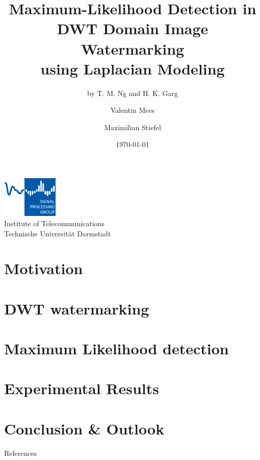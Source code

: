 \documentclass[accentcolor=tud1b,colorbacktitle]{tudbeamer}
\title{Maximum-Likelihood Detection in\\ DWT Domain Image Watermarking\\ using Laplacian Modeling}
\subtitle{by T. M. Ng and H. K. Garg}
\date{\today}
\author[V. Mees \and M. Stiefel]{Valentin Mees \and Maximilian Stiefel}               %
\institute[SPG]{Signal Processing Group}
\begin{document}
\begin{titleframe}
\centering
\vfill
\textit{\Large \insertauthor}
\vfill
\includegraphics[width=0.2\textwidth]{figures/spg_logo}
\vfill
   \insertinstitute\\
   Institute of Telecommunications\\
   Technische Universit\"at Darmstadt\\
\end{titleframe}
%


\section*{Motivation}


\section{DWT watermarking}


\section{Maximum Likelihood detection}


\section{Experimental Results}


\section{Conclusion \& Outlook}


\begin{frame}{References}
\printbibliography
\end{frame}
\end{document}
